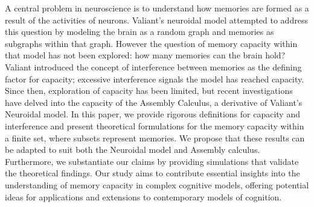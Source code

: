 A central problem in neuroscience is to understand how memories are formed as a result of the activities of neurons. Valiant’s neuroidal model attempted to address this question by modeling the brain as a random graph and memories as subgraphs within that graph. However the question of memory capacity within that model has not been explored: how many memories can the brain hold? Valiant introduced the concept of interference between memories as the defining factor for capacity; excessive interference signals the model has reached capacity. Since then, exploration of capacity has been limited, but recent investigations have delved into the capacity of the Assembly Calculus, a derivative of Valiant's Neuroidal model. In this paper, we provide rigorous definitions for capacity and interference and present theoretical formulations for the memory capacity within a finite set, where subsets represent memories. We propose that these results can be adapted to suit both the Neuroidal model and Assembly calculus. Furthermore, we substantiate our claims by providing simulations that validate the theoretical findings. Our study aims to contribute essential insights into the understanding of memory capacity in complex cognitive models, offering potential ideas for applications and extensions to contemporary models of cognition.